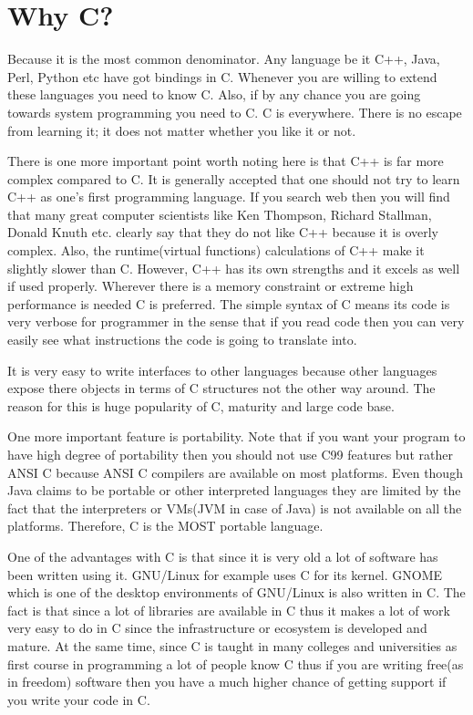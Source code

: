 \section{Why C?}
Because it is the most common denominator. Any language be it C++, Java, Perl,
Python etc have got bindings in C. Whenever you are willing to extend these
languages you need to know C. Also, if by any chance you are going towards
system programming you need to C. C is everywhere. There is no escape from
learning it; it does not matter whether you like it or not. 

There is one more important point worth noting here is that C++ is far more
complex compared to C. It is generally accepted that one should not try to
learn C++ as one's first programming language. If you search web then you will
find that many great computer scientists like Ken Thompson, Richard Stallman,
Donald Knuth etc. clearly say that they do not like C++ because it is overly
complex. Also, the runtime(virtual functions) calculations of C++ make it
slightly slower than C. However, C++ has its own strengths and it excels as
well if used properly. Wherever there is a memory constraint or extreme high
performance is needed C is preferred. The simple syntax of C means its code is
very verbose for programmer in the sense that if you read code then you can
very easily see what instructions the code is going to translate into. 

It is very easy to write interfaces to other languages because other languages
expose there objects in terms of C structures not the other way around. The
reason for this is huge popularity of C, maturity and large code base. 

One more important feature is portability. Note that if you want your program
to have high degree of portability then you should not use C99 features but
rather ANSI C because ANSI C compilers are available on most platforms. Even
though Java claims to be portable or other interpreted languages they are
limited by the fact that the interpreters or VMs(JVM in case of Java) is not
available on all the platforms. Therefore, C is the MOST portable language.

One of the advantages with C is that since it is very old a lot of software has
been written using it. GNU/Linux for example uses C for its kernel. GNOME which
is one of the desktop environments of GNU/Linux is also written in C. The fact
is that since a lot of libraries are available in C thus it makes a lot of work
very easy to do in C since the infrastructure or ecosystem is developed and
mature. At the same time, since C is taught in many colleges and universities
as first course in programming a lot of people know C thus if you are writing
free(as in freedom) software then you have a much higher chance of getting
support if you write your code in C.

